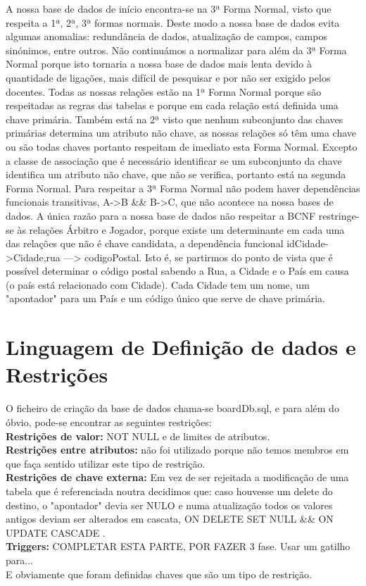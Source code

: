 \documentclass[a4paper]{article}
\begin{document}
A nossa base de dados de início encontra-se na 3ª Forma Normal, visto que respeita a 1ª, 2ª, 3ª formas normais. Deste modo a nossa base de dados evita algumas anomalias: redundância de dados, atualização de campos, campos sinónimos, entre outros. Não continuámos a normalizar para além da 3ª Forma Normal porque isto tornaria a nossa base de dados mais lenta devido à quantidade de ligações, mais difícil de pesquisar e por não ser exigido pelos docentes. Todas as nossas relações estão na 1ª Forma Normal porque são respeitadas as regras das tabelas e porque em cada relação está definida uma chave primária. Também está na 2ª visto que nenhum subconjunto das chaves primárias determina um atributo não chave, as nossas relações só têm uma chave ou são todas chaves portanto respeitam de imediato esta Forma Normal. Excepto a classe de associação que é necessário identificar se um subconjunto da chave identifica um atributo não chave, que não se verifica, portanto está na segunda Forma Normal. Para respeitar a 3ª Forma Normal não podem haver dependências funcionais transitivas, A->B \&\& B->C, que não acontece na nossa bases de dados. A única razão para a nossa base de dados não respeitar a BCNF restringe-se às relações Árbitro e Jogador, porque existe um determinante em cada uma das relações que não é chave candidata, a dependência funcional idCidade->Cidade,rua ---> codigoPostal. Isto é, se partirmos do ponto de vista que é possível determinar o código postal sabendo a Rua, a Cidade e o País em causa (o país está relacionado com Cidade). Cada Cidade tem um nome, um "apontador" para um País e um código único que serve de chave primária.

\section{Linguagem de Definição de dados e Restrições}
O ficheiro de criação da base de dados chama-se boardDb.sql, e para além do óbvio, pode-se encontrar as seguintes restrições:
\\\newline
\textbf{Restrições de valor:} NOT NULL e de limites de atributos. \\
\textbf{Restrições entre atributos:} não foi utilizado porque não temos membros em que faça sentido utilizar este tipo de restrição. \\
\textbf{Restrições de chave externa:} Em vez de ser rejeitada a modificação de uma tabela que é referenciada noutra decidimos que: caso houvesse um delete do destino, o "apontador" devia ser NULO e numa atualização todos os valores antigos deviam ser alterados em cascata, ON DELETE SET NULL \&\& ON UPDATE CASCADE . \\
\textbf{Triggers:} COMPLETAR ESTA PARTE, POR FAZER 3 fase. Usar um gatilho para...
\\\newline
E obviamente que foram definidas chaves que são um tipo de restrição. \\
\end{document}
